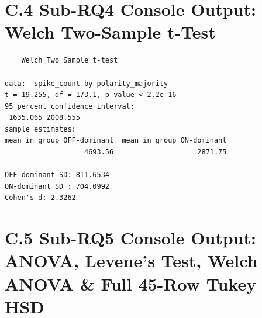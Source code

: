 \section{C.4 Sub-RQ4 Console Output: Welch Two-Sample t-Test}
\begin{verbatim}
	Welch Two Sample t-test

data:  spike_count by polarity_majority
t = 19.255, df = 173.1, p-value < 2.2e-16
95 percent confidence interval:
 1635.065 2008.555
sample estimates:
mean in group OFF-dominant  mean in group ON-dominant 
                   4693.56                    2871.75 

OFF-dominant SD: 811.6534
ON-dominant SD : 704.0992
Cohen's d: 2.3262
\end{verbatim}

\section{C.5 Sub-RQ5 Console Output: ANOVA, Levene's Test, Welch ANOVA \& Full 45-Row Tukey HSD}
